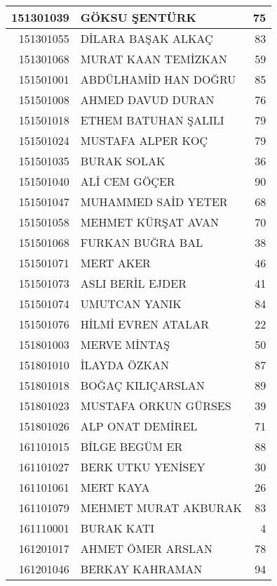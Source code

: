 \documentclass[12pt]{article}
\begin{document}
\begin{longtable}{||r||l||r||}
    \midrule
    151301039 & GÖKSU ŞENTÜRK & 75 \\
    \midrule
    151301055 & DİLARA BAŞAK ALKAÇ & 83 \\
    \midrule
    151301068 & MURAT KAAN TEMİZKAN & 59 \\
    \midrule
    151501001 & ABDÜLHAMİD HAN DOĞRU & 85 \\
    \midrule
    151501008 & AHMED DAVUD DURAN & 76 \\
    \midrule
    151501018 & ETHEM BATUHAN ŞALILI & \cellcolor[rgb]{ 1,  1,  0} 79 \\
    \midrule
    151501024 & MUSTAFA ALPER KOÇ & 79 \\
    \midrule
    151501035 & BURAK SOLAK & 36 \\
    \midrule
    151501040 & ALİ CEM GÖÇER & 90 \\
    \midrule
    151501047 & MUHAMMED SAİD YETER & 68 \\
    \midrule
    151501058 & MEHMET KÜRŞAT AVAN & 70 \\
    \midrule
    151501068 & FURKAN BUĞRA BAL & 38 \\
    \midrule
    151501071 & MERT AKER & 46 \\
    \midrule
    151501073 & ASLI BERİL EJDER & 41 \\
    \midrule
    151501074 & UMUTCAN YANIK & 84 \\
    \midrule
    151501076 & HİLMİ EVREN ATALAR & 22 \\
    \midrule
    151801003 & MERVE MİNTAŞ & 50 \\
    \midrule
    151801010 & İLAYDA ÖZKAN & 87 \\
    \midrule
    151801018 & BOĞAÇ KILIÇARSLAN & 89 \\
    \midrule
    151801023 & MUSTAFA ORKUN GÜRSES & 39 \\
    \midrule
    151801026 & ALP ONAT DEMİREL & 71 \\
    \midrule
    161101015 & BİLGE BEGÜM ER & 88 \\
    \midrule
    161101027 & BERK UTKU YENİSEY & 30 \\
    \midrule
    161101061 & MERT KAYA & 26 \\
    \midrule
    161101079 & MEHMET MURAT AKBURAK & 83 \\
    \midrule
    161110001 & BURAK KATI & 4 \\
    \midrule
    161201017 & AHMET ÖMER ARSLAN & \cellcolor[rgb]{ 1,  1,  0} 78 \\
    \midrule
    161201046 & BERKAY KAHRAMAN & 94 \\

\end{longtable}
\end{document}
